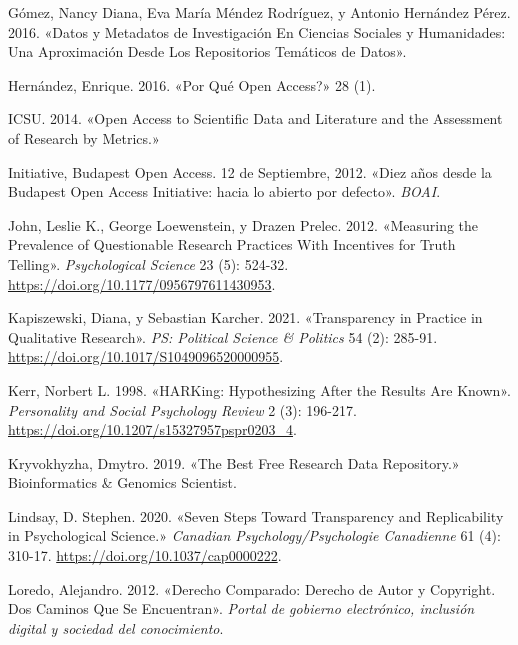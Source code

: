 \documentclass[
  spanish,
  a4paper,
  oneside]{scrbook}
\newlength{\cslhangindent}
\newenvironment{CSLReferences}[2] %
 {\begin{list}{}{%
  \setlength{\itemindent}{0pt}
  \setlength{\leftmargin}{0pt}
  \setlength{\parsep}{0pt}
  \ifodd #1
   \setlength{\leftmargin}{\cslhangindent}
   \setlength{\itemindent}{-1\cslhangindent}
  \fi
  \setlength{\itemsep}{#2\baselineskip}}}
 {\end{list}}
\begin{document}
\begin{CSLReferences}{1}{0}
Gómez, Nancy Diana, Eva María Méndez Rodríguez, y Antonio Hernández
Pérez. 2016. {«Datos y Metadatos de Investigaci{ó}n En Ciencias Sociales
y Humanidades: Una Aproximaci{ó}n Desde Los Repositorios Tem{á}ticos de
Datos»}.

Hernández, Enrique. 2016. {«{\textquestiondown}{Por} Qu{é} Open
Access?»} 28 (1).

ICSU. 2014. {«Open {Access} to {Scientific Data} and {Literature} and
the {Assessment} of {Research} by {Metrics}.»}

Initiative, Budapest Open Access. 12 de Septiembre, 2012. {«{Diez a{ñ}os
desde la Budapest Open Access Initiative: hacia lo abierto por
defecto}»}. \emph{BOAI}.

John, Leslie K., George Loewenstein, y Drazen Prelec. 2012. {«Measuring
the {Prevalence} of {Questionable Research Practices With Incentives}
for {Truth Telling}»}. \emph{Psychological Science} 23 (5): 524-32.
\url{https://doi.org/10.1177/0956797611430953}.

Kapiszewski, Diana, y Sebastian Karcher. 2021. {«Transparency in
{Practice} in {Qualitative Research}»}. \emph{PS: Political Science \&
Politics} 54 (2): 285-91.
\url{https://doi.org/10.1017/S1049096520000955}.

Kerr, Norbert L. 1998. {«{HARKing}: {Hypothesizing After} the {Results}
Are {Known}»}. \emph{Personality and Social Psychology Review} 2 (3):
196-217. \url{https://doi.org/10.1207/s15327957pspr0203_4}.

Kryvokhyzha, Dmytro. 2019. {«The {Best Free Research Data Repository}.»}
Bioinformatics \& Genomics Scientist.

Lindsay, D. Stephen. 2020. {«Seven Steps Toward Transparency and
Replicability in Psychological Science.»} \emph{Canadian
Psychology/Psychologie Canadienne} 61 (4): 310-17.
\url{https://doi.org/10.1037/cap0000222}.

Loredo, Alejandro. 2012. {«Derecho {Comparado}: {Derecho} de {Autor} y
{Copyright}. {Dos} Caminos Que Se Encuentran»}. \emph{Portal de gobierno
electr{ó}nico, inclusi{ó}n digital y sociedad del conocimiento}.


\end{CSLReferences}
\end{document}
